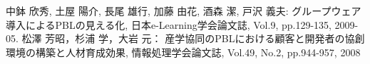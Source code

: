 \documentclass[a4j,9pt,twoside]{jarticle}
\newcommand{\me}{中鉢 欣秀}
\begin{document}
\begin{multicols}{2}
\begin{thebibliography}{99}
		 \me, 土屋 陽介, 長尾 雄行, 加藤 由花, 酒森 潔, 戸沢 義夫: グループウェア導入によるPBLの見える化, 日本e-Learning学会論文誌, Vol.9, pp.129-135, 2009-05.
		 松澤 芳昭，杉浦 学，大岩 元： 産学協同のPBLにおける顧客と開発者の協創環境の構築と人材育成効果, 情報処理学会論文誌,  Vol.49, No.2, pp.944-957, 2008
	\end{thebibliography}
\newpage
\end{multicols}
\end{document}

